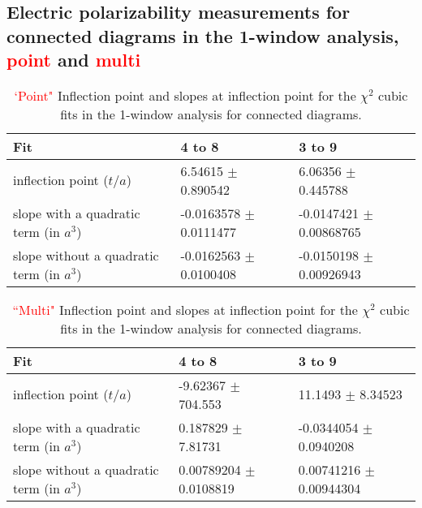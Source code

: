 \subsection{Electric polarizability measurements for connected diagrams in the 
1-window analysis, \textcolor{red}{point} and \textcolor{red}{multi}}
\begin{table}[H]
\begin{center}
    \begin{tabular}{ | p{2.7cm} | p{2.6cm} | p{2.6cm} | }
    \hline
     Fit   & 4 to 8   & 3 to 9  \\ \hline
     inflection point ($t/a$) &     6.54615 $\pm$ 0.890542     &    6.06356 $\pm$ 0.445788      \\ \hline
     slope with  a quadratic term (in $a^3$) &    -0.0163578 $\pm$ 0.0111477     &    -0.0147421 $\pm$ 0.00868765          \\ \hline
     slope without  a quadratic term (in $a^3$) &    -0.0162563 $\pm$ 0.0100408     &    -0.0150198 $\pm$ 0.00926943   \\ \hline
    \end{tabular}
\end{center}
\caption{\textcolor{red}{`Point"} Inflection point and slopes at inflection point for the 
$\chi^2$ cubic fits in the 1-window analysis for connected diagrams.}
\label{tab:1walphaconnectedPoint}
\end{table}
\begin{table}[H]
\begin{center}
    \begin{tabular}{ | p{2.7cm} | p{2.6cm} | p{2.6cm} | }
    \hline
     Fit   & 4 to 8   & 3 to 9  \\ \hline
     inflection point ($t/a$) &     -9.62367 $\pm$ 704.553     &     11.1493 $\pm$ 8.34523       \\ \hline
     slope with  a quadratic term (in $a^3$) &    0.187829 $\pm$ 7.81731     &    -0.0344054 $\pm$ 0.0940208           \\ \hline
     slope without  a quadratic term (in $a^3$) &    0.00789204 $\pm$ 0.0108819     &     0.00741216 $\pm$ 0.00944304   \\ \hline
    \end{tabular}
\end{center}
\caption{\textcolor{red}{``Multi"} Inflection point and slopes at inflection point for the $\chi^2$ cubic fits in the 1-window analysis for connected diagrams.}
\label{tab:1walphaconnectedMulti}
\end{table}


